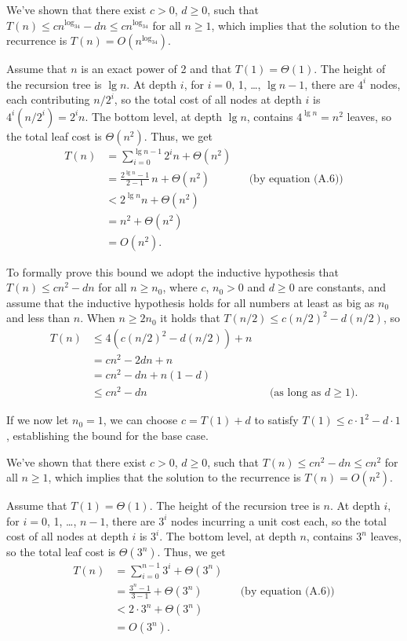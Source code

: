 We've shown that there exist $c>0$, $d\ge0$, such that $T(n)\le cn^{\log_34}-dn\le cn^{\log_34}$ for all $n\ge1$, which implies that the solution to the recurrence is $T(n)=O(n^{\log_34})$.

\subexercise
Assume that $n$ is an exact power of 2 and that $T(1)=\Theta(1)$.
The height of the recursion tree is $\lg n$.
At depth $i$, for $i=0$, 1, \dots, $\lg n-1$, there are $4^i$ nodes, each contributing $n/2^i$, so the total cost of all nodes at depth $i$ is $4^i(n/2^i)=2^in$.
The bottom level, at depth $\lg n$, contains $4^{\lg n}=n^2$ leaves, so the total leaf cost is $\Theta(n^2)$.
Thus, we get
\begin{align*}
    T(n) &= \sum_{i=0}^{\lg n-1}2^in+\Theta(n^2) \\
    &= \frac{2^{\lg n}-1}{2-1}\,n+\Theta(n^2) && \text{(by equation (A.6))} \\[1mm]
    &< 2^{\lg n}n+\Theta(n^2) \\
    &= n^2+\Theta(n^2) \\
    &= O(n^2).
\end{align*}

To formally prove this bound we adopt the inductive hypothesis that $T(n)\le cn^2-dn$ for all $n\ge n_0$, where $c$, $n_0>0$ and $d\ge0$ are constants, and assume that the inductive hypothesis holds for all numbers at least as big as $n_0$ and less than $n$.
When $n\ge2n_0$ it holds that $T(n/2)\le c(n/2)^2-d(n/2)$, so
\begin{align*}
    T(n) &\le 4(c(n/2)^2-d(n/2))+n \\
    &= cn^2-2dn+n \\
    &= cn^2-dn+n(1-d) \\
    &\le cn^2-dn && \text{(as long as $d\ge1$)}.
\end{align*}

If we now let $n_0=1$, we can choose $c=T(1)+d$ to satisfy $T(1)\le c\cdot1^2-d\cdot1$, establishing the bound for the base case.

We've shown that there exist $c>0$, $d\ge0$, such that $T(n)\le cn^2-dn\le cn^2$ for all $n\ge1$, which implies that the solution to the recurrence is $T(n)=O(n^2)$.

\subexercise
Assume that $T(1)=\Theta(1)$.
The height of the recursion tree is $n$.
At depth $i$, for $i=0$, 1, \dots, $n-1$, there are $3^i$ nodes incurring a unit cost each, so the total cost of all nodes at depth $i$ is $3^i$.
The bottom level, at depth $n$, contains $3^n$ leaves, so the total leaf cost is $\Theta(3^n)$.
Thus, we get
\begin{align*}
    T(n) &= \sum_{i=0}^{n-1}3^i+\Theta(3^n) \\[1mm]
    &= \frac{3^n-1}{3-1}+\Theta(3^n) && \text{(by equation (A.6))} \\[1mm]
    &< 2\cdot3^n+\Theta(3^n) \\
    &= O(3^n).
\end{align*}


